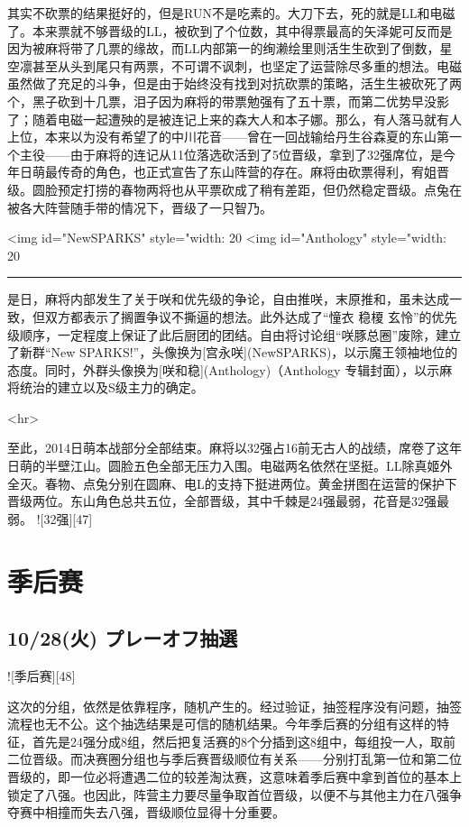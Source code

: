 其实不砍票的结果挺好的，但是RUN不是吃素的。大刀下去，死的就是LL和电磁了。本来票就不够晋级的LL，被砍到了个位数，其中得票最高的矢泽妮可反而是因为被麻将带了几票的缘故，而LL内部第一的绚濑绘里则活生生砍到了倒数，星空凛甚至从头到尾只有两票，不可谓不讽刺，也坚定了运营除尽多重的想法。电磁虽然做了充足的斗争，但是由于始终没有找到对抗砍票的策略，活生生被砍死了两个，黑子砍到十几票，泪子因为麻将的带票勉强有了五十票，而第二优势早没影了；随着电磁一起遭殃的是被连记上来的森大人和本子娜。那么，有人落马就有人上位，本来以为没有希望了的中川花音——曾在一回战输给丹生谷森夏的东山第一个主役——由于麻将的连记从11位落选砍活到了5位晋级，拿到了32强席位，是今年日萌最传奇的角色，也正式宣告了东山阵营的存在。麻将由砍票得利，宥姐晋级。圆脸预定打捞的春物两将也从平票砍成了稍有差距，但仍然稳定晋级。点兔在被各大阵营随手带的情况下，晋级了一只智乃。

<img id="NewSPARKS" style="width: 20%
<img id="Anthology" style="width: 20%

\rule{\textwidth}{1pt}

是日，麻将内部发生了关于咲和优先级的争论，自由推咲，末原推和，虽未达成一致，但双方都表示了搁置争议不撕逼的想法。此外达成了“憧衣 稳榎 玄怜”的优先级顺序，一定程度上保证了此后厨团的团结。自由将讨论组“咲豚总圈”废除，建立了新群“New SPARKS!”，头像换为[宫永咲](NewSPARKS)，以示魔王领袖地位的态度。同时，外群头像换为[咲和稳](Anthology)（Anthology 专辑封面），以示麻将统治的建立以及S级主力的确定。

<hr>

至此，2014日萌本战部分全部结束。麻将以32强占16前无古人的战绩，席卷了这年日萌的半壁江山。圆脸五色全部无压力入围。电磁两名依然在坚挺。LL除真姬外全灭。春物、点兔分别在圆麻、电L的支持下挺进两位。黄金拼图在运营的保护下晋级两位。东山角色总共五位，全部晋级，其中千棘是24强最弱，花音是32强最弱。
![32强][47]

\chapter{季后赛}

\section{10/28(火) プレーオフ抽選}

![季后赛][48]

这次的分组，依然是依靠程序，随机产生的。经过验证，抽签程序没有问题，抽签流程也无不公。这个抽选结果是可信的随机结果。今年季后赛的分组有这样的特征，首先是24强分成8组，然后把复活赛的8个分插到这8组中，每组投一人，取前二位晋级。而决赛圈分组也与季后赛晋级顺位有关系——分别打乱第一位和第二位晋级的，即一位必将遭遇二位的较差淘汰赛，这意味着季后赛中拿到首位的基本上锁定了八强。也因此，阵营主力要尽量争取首位晋级，以便不与其他主力在八强争夺赛中相撞而失去八强，晋级顺位显得十分重要。

